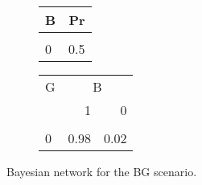 \documentclass[10pt,]{scrartcl}
\begin{document}
\begin{figure}
\hspace{2cm}
\hfill
\hspace{-3cm}\begin{subfigure}[!ht]{0.7\textwidth}
\begin{table}[H]
\centering
\begin{tabular}{lr}
\toprule
B & Pr\\
\midrule
\cellcolor{gray!6}{1} & \cellcolor{gray!6}{0.5}\\
0 & 0.5\\
\bottomrule
\end{tabular}
\end{table}

\begin{table}[H]
\centering
\begin{tabular}{lrr}
\toprule
\multicolumn{1}{c}{G} & \multicolumn{2}{c}{B} \\
  & 1 & 0\\
\midrule
\cellcolor{gray!6}{1} & \cellcolor{gray!6}{0.02} & \cellcolor{gray!6}{0.98}\\
0 & 0.98 & 0.02\\
\bottomrule
\end{tabular}
\end{table}
\end{subfigure}
\label{fig-BG}
\caption{Bayesian network for the \textsf{BG} scenario.}
\end{figure}
\end{document}
